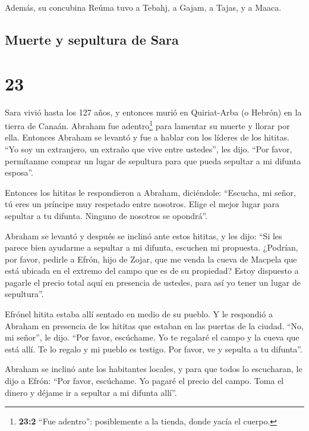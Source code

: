  Además, su concubina Reúma tuvo a Tebahj, a Gajam, a
Tajas, y a Maaca.

\hypertarget{muerte-y-sepultura-de-sara}{%
\subsection{Muerte y sepultura de
Sara}\label{muerte-y-sepultura-de-sara}}

\hypertarget{section-22}{%
\section{23}\label{section-22}}

 Sara vivió hasta los 127 años,  y entonces
murió en Quiriat-Arba (o Hebrón) en la tierra de Canaán. Abraham fue
adentro\footnote{\textbf{23:2} ``Fue adentro'': posiblemente a la
  tienda, donde yacía el cuerpo.} para lamentar su muerte y llorar por
ella.  Entonces Abraham se levantó y fue a hablar con los
líderes de los hititas.  ``Yo soy un extranjero, un
extraño que vive entre ustedes'', les dijo. ``Por favor, permítanme
comprar un lugar de sepultura para que pueda sepultar a mi difunta
esposa''.

 Entonces los hititas le respondieron a Abraham,
diciéndole:  ``Escucha, mi señor, tú eres un príncipe muy
respetado entre nosotros. Elige el mejor lugar para sepultar a tu
difunta. Ninguno de nosotros se opondrá''.

 Abraham se levantó y después se inclinó ante estos
hititas,  y les dijo: ``Si les parece bien ayudarme a
sepultar a mi difunta, escuchen mi propuesta. ¿Podrían, por favor,
pedirle a Efrón, hijo de Zojar,  que me venda la cueva de
Macpela que está ubicada en el extremo del campo que es de su propiedad?
Estoy dispuesto a pagarle el precio total aquí en presencia de ustedes,
para así yo tener un lugar de sepultura''.

 Efrónel hitita estaba allí sentado en medio de su
pueblo. Y le respondió a Abraham en presencia de los hititas que estaban
en las puertas de la ciudad.  ``No, mi señor'', le dijo.
``Por favor, escúchame. Yo te regalaré el campo y la cueva que está
allí. Te lo regalo y mi pueblo es testigo. Por favor, ve y sepulta a tu
difunta''.

 Abraham se inclinó ante los habitantes locales,
 y para que todos lo escucharan, le dijo a Efrón: ``Por
favor, escúchame. Yo pagaré el precio del campo. Toma el dinero y déjame
ir a sepultar a mi difunta allí''.

